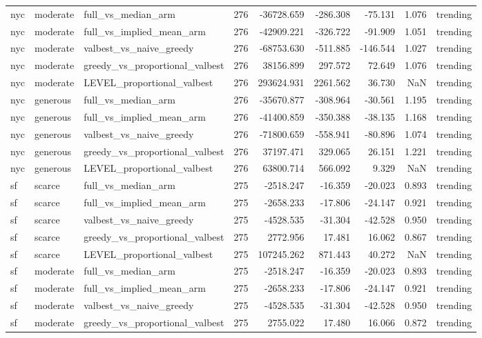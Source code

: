 \begin{tabular}{lllrrrrrl}
nyc & moderate & full\_vs\_median\_arm & 276 & -36728.659 & -286.308 & -75.131 & 1.076 & trending \\
nyc & moderate & full\_vs\_implied\_mean\_arm & 276 & -42909.221 & -326.722 & -91.909 & 1.051 & trending \\
nyc & moderate & valbest\_vs\_naive\_greedy & 276 & -68753.630 & -511.885 & -146.544 & 1.027 & trending \\
nyc & moderate & greedy\_vs\_proportional\_valbest & 276 & 38156.899 & 297.572 & 72.649 & 1.076 & trending \\
nyc & moderate & LEVEL\_proportional\_valbest & 276 & 293624.931 & 2261.562 & 36.730 & NaN & trending \\
nyc & generous & full\_vs\_median\_arm & 276 & -35670.877 & -308.964 & -30.561 & 1.195 & trending \\
nyc & generous & full\_vs\_implied\_mean\_arm & 276 & -41400.859 & -350.388 & -38.135 & 1.168 & trending \\
nyc & generous & valbest\_vs\_naive\_greedy & 276 & -71800.659 & -558.941 & -80.896 & 1.074 & trending \\
nyc & generous & greedy\_vs\_proportional\_valbest & 276 & 37197.471 & 329.065 & 26.151 & 1.221 & trending \\
nyc & generous & LEVEL\_proportional\_valbest & 276 & 63800.714 & 566.092 & 9.329 & NaN & trending \\
sf & scarce & full\_vs\_median\_arm & 275 & -2518.247 & -16.359 & -20.023 & 0.893 & trending \\
sf & scarce & full\_vs\_implied\_mean\_arm & 275 & -2658.233 & -17.806 & -24.147 & 0.921 & trending \\
sf & scarce & valbest\_vs\_naive\_greedy & 275 & -4528.535 & -31.304 & -42.528 & 0.950 & trending \\
sf & scarce & greedy\_vs\_proportional\_valbest & 275 & 2772.956 & 17.481 & 16.062 & 0.867 & trending \\
sf & scarce & LEVEL\_proportional\_valbest & 275 & 107245.262 & 871.443 & 40.272 & NaN & trending \\
sf & moderate & full\_vs\_median\_arm & 275 & -2518.247 & -16.359 & -20.023 & 0.893 & trending \\
sf & moderate & full\_vs\_implied\_mean\_arm & 275 & -2658.233 & -17.806 & -24.147 & 0.921 & trending \\
sf & moderate & valbest\_vs\_naive\_greedy & 275 & -4528.535 & -31.304 & -42.528 & 0.950 & trending \\
sf & moderate & greedy\_vs\_proportional\_valbest & 275 & 2755.022 & 17.480 & 16.066 & 0.872 & trending \\

\end{tabular}
